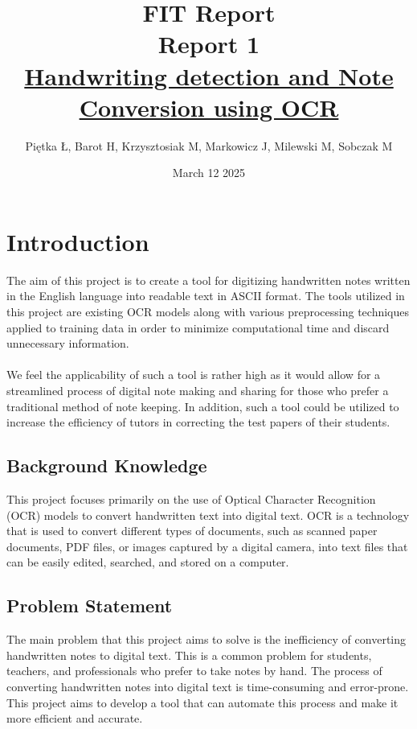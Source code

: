 \documentclass[twoside,a4paper]{article}
\title{\textbf{FIT Report} \\[1ex] \large Report 1 \\[2ex] \Large \underline{Handwriting detection and Note Conversion using OCR}}
\author{Piętka Ł, Barot H, Krzysztosiak M, Markowicz J, Milewski M, Sobczak M}
\date{March 12 2025}
\begin{document}
\maketitle
\tableofcontents
\newpage
\section{Introduction}
The aim of this project is to create a tool for digitizing handwritten notes written in the English language into readable text in ASCII format. The tools utilized in this project are existing OCR models along with various preprocessing techniques applied to training data in order to minimize computational time and discard unnecessary information. \\\\
We feel the applicability of such a tool is rather high as it would allow for a streamlined process of digital note making and sharing for those who prefer a traditional method of note keeping. In addition, such a tool could be utilized to increase the efficiency of tutors in correcting the test papers of their students.

\subsection{Background Knowledge}
This project focuses primarily on the use of Optical Character Recognition (OCR) models to convert handwritten text into digital text. 
OCR is a technology that is used to convert different types of documents, such as scanned paper documents, PDF files, or images captured by a digital camera, into text files that can be easily edited, searched, and stored on a computer.\\




\subsection{Problem Statement}
The main problem that this project aims to solve is the inefficiency of converting handwritten notes to digital text. 
This is a common problem for students, teachers, and professionals who prefer to take notes by hand. 
The process of converting handwritten notes into digital text is time-consuming and error-prone. 
This project aims to develop a tool that can automate this process and make it more efficient and accurate. \\
 
\end{document}
